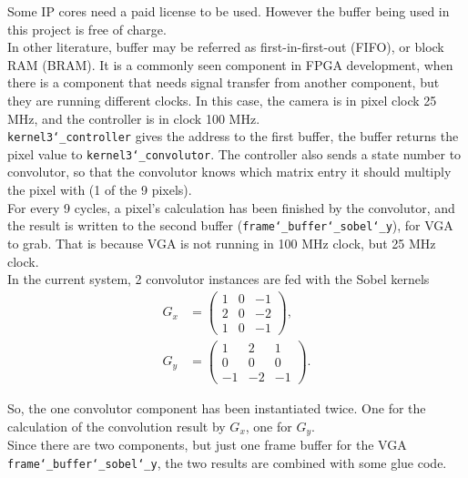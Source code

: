 \documentclass{article}
\begin{document}
	Some IP cores need a paid license to be used. However the buffer being used in this project is free of charge.
	\\
	
	In other literature, buffer may be referred as first-in-first-out (FIFO), or block RAM  (BRAM). It is a commonly seen component in FPGA development, when there is a component that needs signal transfer from another component, but they are running different clocks. In this case, the camera is in pixel clock 25 MHz, and the controller is in clock 100 MHz.
	\\
	
	\texttt{kernel3\char`_controller} gives the address to the first buffer, the buffer returns the pixel value to \texttt{kernel3\char`_convolutor}. The controller also sends a state number to convolutor, so that the convolutor knows which matrix entry it should multiply the pixel with (1 of the 9 pixels).
	\\
	
	For every 9 cycles, a pixel’s calculation has been finished by the convolutor, and the result is written to the second buffer (\texttt{frame\char`_buffer\char`_sobel\char`_y}), for VGA to grab. That is because VGA is not running in 100 MHz clock, but 25 MHz clock.
	\\
	
	In the current system, 2 convolutor instances are fed with the Sobel kernels \cite{sobel}
	\begin{align*}
		G_x&=
		\begin{pmatrix}
			1&0&-1\\
			2&0&-2\\
			1&0&-1
		\end{pmatrix},\\
		G_y&=
		\begin{pmatrix}
			1&2&1\\
			0&0&0\\
			-1&-2&-1
		\end{pmatrix}.
	\end{align*}
	
	So, the one convolutor component has been instantiated twice. One for the calculation of the convolution result by $G_x$, one for $G_y$.
	\\
	
	Since there are two components, but just one frame buffer for the VGA \texttt{frame\char`_buffer\char`_sobel\char`_y}, the two results are combined with some glue code.
	\\
	
\end{document}
